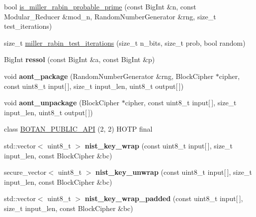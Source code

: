 \begin{DoxyCompactItemize}
\item 
bool \mbox{\hyperlink{namespace_botan_a83e0f4d2a60382f64d3bc66e5643d1b3}{is\+\_\+miller\+\_\+rabin\+\_\+probable\+\_\+prime}} (const Big\+Int \&n, const Modular\+\_\+\+Reducer \&mod\+\_\+n, Random\+Number\+Generator \&rng, size\+\_\+t test\+\_\+iterations)
\item 
size\+\_\+t \mbox{\hyperlink{namespace_botan_ad2d5621df44479136319b391ff899802}{miller\+\_\+rabin\+\_\+test\+\_\+iterations}} (size\+\_\+t n\+\_\+bits, size\+\_\+t prob, bool random)
\item 
\mbox{\label{namespace_botan_a11ae5649eb61c01dc8f824e97ab386fd}} 
Big\+Int {\bfseries ressol} (const Big\+Int \&a, const Big\+Int \&p)
\item 
\mbox{\label{namespace_botan_a746811da38c5d4ffb4d4d8a4016fbf3b}} 
void {\bfseries aont\+\_\+package} (Random\+Number\+Generator \&rng, Block\+Cipher $\ast$cipher, const uint8\+\_\+t input\mbox{[}$\,$\mbox{]}, size\+\_\+t input\+\_\+len, uint8\+\_\+t output\mbox{[}$\,$\mbox{]})
\item 
\mbox{\label{namespace_botan_adffab170cbbe7958e0999119feccf542}} 
void {\bfseries aont\+\_\+unpackage} (Block\+Cipher $\ast$cipher, const uint8\+\_\+t input\mbox{[}$\,$\mbox{]}, size\+\_\+t input\+\_\+len, uint8\+\_\+t output\mbox{[}$\,$\mbox{]})
\item 
class \mbox{\hyperlink{namespace_botan_af945fa6198fa0d818e398c3e50303ddf}{B\+O\+T\+A\+N\+\_\+\+P\+U\+B\+L\+I\+C\+\_\+\+A\+PI}} (2, 2) H\+O\+TP final
\item 
\mbox{\label{namespace_botan_aabd375cd98986aa257173c5023d6f361}} 
std\+::vector$<$ uint8\+\_\+t $>$ {\bfseries nist\+\_\+key\+\_\+wrap} (const uint8\+\_\+t input\mbox{[}$\,$\mbox{]}, size\+\_\+t input\+\_\+len, const Block\+Cipher \&bc)
\item 
\mbox{\label{namespace_botan_aa193a41f7a5a433af6648e05412d7927}} 
secure\+\_\+vector$<$ uint8\+\_\+t $>$ {\bfseries nist\+\_\+key\+\_\+unwrap} (const uint8\+\_\+t input\mbox{[}$\,$\mbox{]}, size\+\_\+t input\+\_\+len, const Block\+Cipher \&bc)
\item 
\mbox{\label{namespace_botan_a5bae35f87ea07faaaf2375a8dfd96958}} 
std\+::vector$<$ uint8\+\_\+t $>$ {\bfseries nist\+\_\+key\+\_\+wrap\+\_\+padded} (const uint8\+\_\+t input\mbox{[}$\,$\mbox{]}, size\+\_\+t input\+\_\+len, const Block\+Cipher \&bc)

\end{DoxyCompactItemize}
